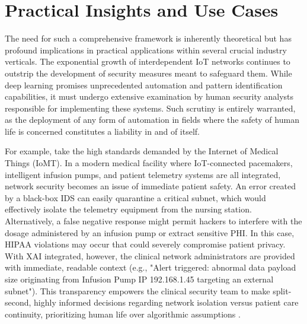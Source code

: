 \documentclass[12pt]{article}
\begin{document}
    \section{Practical Insights and Use Cases}
    The need for such a comprehensive framework is inherently theoretical but has profound implications in practical applications within several crucial industry verticals. The exponential growth of interdependent IoT networks continues to outstrip the development of security measures meant to safeguard them. While deep learning promises unprecedented automation and pattern identification capabilities, it must undergo extensive examination by human security analysts responsible for implementing these systems. Such scrutiny is entirely warranted, as the deployment of any form of automation in fields where the safety of human life is concerned constitutes a liability in and of itself.

    For example, take the high standards demanded by the Internet of Medical Things (IoMT). In a modern medical facility where IoT-connected pacemakers, intelligent infusion pumps, and patient telemetry systems are all integrated, network security becomes an issue of immediate patient safety. An error created by a black-box IDS can easily quarantine a critical subnet, which would effectively isolate the telemetry equipment from the nursing station. Alternatively, a false negative response might permit hackers to interfere with the dosage administered by an infusion pump or extract sensitive PHI. In this case, HIPAA violations may occur that could severely compromise patient privacy. With XAI integrated, however, the clinical network administrators are provided with immediate, readable context (e.g., "Alert triggered: abnormal data payload size originating from Infusion Pump IP 192.168.1.45 targeting an external subnet"). This transparency empowers the clinical security team to make split-second, highly informed decisions regarding network isolation versus patient care continuity, prioritizing human life over algorithmic assumptions \cite{judith2023efficient}.
\end{document}
